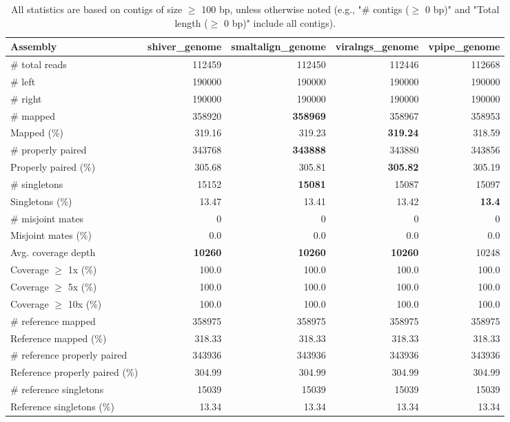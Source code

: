 \documentclass[12pt,a4paper]{article}
\begin{document}
\begin{table}[ht]
\begin{center}
\caption{All statistics are based on contigs of size $\geq$ 100 bp, unless otherwise noted (e.g., "\# contigs ($\geq$ 0 bp)" and "Total length ($\geq$ 0 bp)" include all contigs).}
\begin{tabular}{|l*{4}{|r}|}
\hline
Assembly & shiver\_genome & smaltalign\_genome & viralngs\_genome & vpipe\_genome \\ \hline
\# total reads & 112459 & 112450 & 112446 & 112668 \\ \hline
\# left & 190000 & 190000 & 190000 & 190000 \\ \hline
\# right & 190000 & 190000 & 190000 & 190000 \\ \hline
\# mapped & 358920 & {\bf 358969} & 358967 & 358953 \\ \hline
Mapped (\%) & 319.16 & 319.23 & {\bf 319.24} & 318.59 \\ \hline
\# properly paired & 343768 & {\bf 343888} & 343880 & 343856 \\ \hline
Properly paired (\%) & 305.68 & 305.81 & {\bf 305.82} & 305.19 \\ \hline
\# singletons & 15152 & {\bf 15081} & 15087 & 15097 \\ \hline
Singletons (\%) & 13.47 & 13.41 & 13.42 & {\bf 13.4} \\ \hline
\# misjoint mates & 0 & 0 & 0 & 0 \\ \hline
Misjoint mates (\%) & 0.0 & 0.0 & 0.0 & 0.0 \\ \hline
Avg. coverage depth & {\bf 10260} & {\bf 10260} & {\bf 10260} & 10248 \\ \hline
Coverage $\geq$ 1x (\%) & 100.0 & 100.0 & 100.0 & 100.0 \\ \hline
Coverage $\geq$ 5x (\%) & 100.0 & 100.0 & 100.0 & 100.0 \\ \hline
Coverage $\geq$ 10x (\%) & 100.0 & 100.0 & 100.0 & 100.0 \\ \hline
\# reference mapped & 358975 & 358975 & 358975 & 358975 \\ \hline
Reference mapped (\%) & 318.33 & 318.33 & 318.33 & 318.33 \\ \hline
\# reference properly paired & 343936 & 343936 & 343936 & 343936 \\ \hline
Reference properly paired (\%) & 304.99 & 304.99 & 304.99 & 304.99 \\ \hline
\# reference singletons & 15039 & 15039 & 15039 & 15039 \\ \hline
Reference singletons (\%) & 13.34 & 13.34 & 13.34 & 13.34 \\ \hline

\end{tabular}
\end{center}
\end{table}
\end{document}

